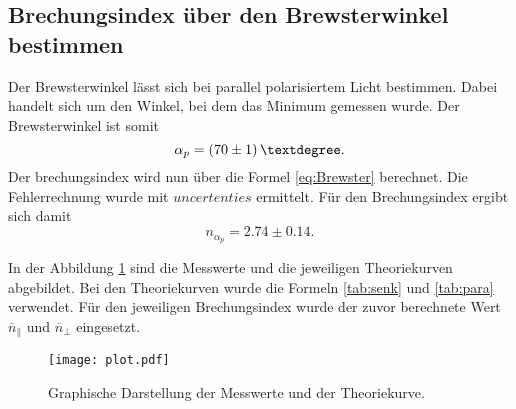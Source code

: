 \subsection{Brechungsindex über den Brewsterwinkel bestimmen}

Der Brewsterwinkel lässt sich bei parallel polarisiertem Licht bestimmen.
Dabei handelt sich um den Winkel, bei dem das Minimum gemessen wurde.
Der Brewsterwinkel ist somit
\begin{equation*}
  \alpha_p = \qty{70 \pm 1}{°}.
\end{equation*}    
Der brechungsindex wird nun über die Formel \ref{eq:Brewster} berechnet.
Die Fehlerrechnung wurde mit $uncertenties$ ermittelt.
Für den Brechungsindex ergibt sich damit 
\begin{equation*}
  n_{\alpha_p} = 2.74 \pm 0.14.
\end{equation*}

\noindent In der Abbildung \ref{fig:plot} sind die Messwerte und die jeweiligen Theoriekurven abgebildet.
Bei den Theoriekurven wurde die Formeln \ref{tab:senk} und \ref{tab:para} verwendet.
Für den jeweiligen Brechungsindex wurde der zuvor berechnete Wert $\overline{n}_\parallel$ und $\overline{n}_\perp$ eingesetzt.

\begin{figure}
  \centering
  \texttt{[image: plot.pdf]}
  \caption{Graphische Darstellung der Messwerte und der Theoriekurve.}
  \label{fig:plot}
\end{figure}

